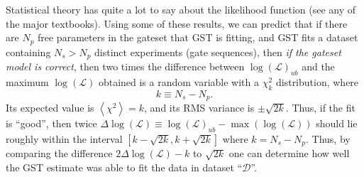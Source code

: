 \documentclass{article}[11pt]
\newcommand{\expec}[1]{\ensuremath{\left\langle#1\right\rangle}}
\begin{document}
Statistical theory has quite a lot to say about the likelihood function (see any of the major textbooks).  Using some of these results, we can predict that if there are $N_p$ free parameters in the gateset that GST is fitting, and GST fits a dataset containing $N_s > N_p$ distinct experiments (gate sequences), then \emph{if the gateset model is correct}, then two times the difference between $\log(\mathcal{L})_{ub}$ and the maximum $\log(\mathcal{L})$ obtained is a random variable with a $\chi^2_{k}$ distribution, where 
$$k \equiv N_s - N_p.$$
Its expected value is $\expec{\chi^2}=k$, and its RMS variance is $\pm\sqrt{2k}$.  Thus, if the fit is ``good'', then twice $\Delta\log(\mathcal{L}) \equiv \log(\mathcal{L})_{ub} - \max(\log(\mathcal{L}))$ should lie roughly within the interval $[k-\sqrt{2k},k+\sqrt{2k}]$ where $k = N_s-N_p$. 
Thus, by comparing the difference $2\Delta\log(\mathcal{L}) - k$ to $\sqrt{2k}$ one can determine how well the GST estimate was able to fit the data in dataset ``$\mathcal{D}$''.
\end{document}

